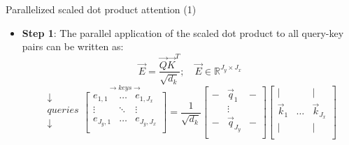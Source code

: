 
\begin{vbframe}{Parallelized scaled dot product attention (1)}

\vfill 

\begin{itemize}
\item \textbf{Step 1}: The parallel application of the scaled dot product to all query-key pairs can be written as:
$$\vec {E} = \frac{ \vec {Q} \vec {K}^T}{\sqrt{d_k}}; \quad \vec E \in \mathbb{R}^{J_y \times J_x}$$
$$ \begin{matrix} \downarrow \\ queries \\ \downarrow \\ \end{matrix} \overset{\rightarrow keys \rightarrow}{
\begin{bmatrix}
e_{1,1} & \ldots & e_{1,J_x} \\
\vdots & \ddots & \vdots \\
e_{J_y,1} & \ldots & e_{J_y,J_x} \\
\end{bmatrix}} = \frac{1}{\sqrt{d_k}}
\begin{bmatrix} 
- & \vec q_1  & -  \\
& \vdots & \\
-  & \vec q_{J_y}  &  -  \\
\end{bmatrix}  
\begin{bmatrix} 
\lvert &  & \lvert  \\
\vec k_1 & \ldots & \vec k_{J_x} \\
\lvert &  & \lvert  \\
\end{bmatrix}$$
\end{itemize}

\vfill

\end{vbframe}



